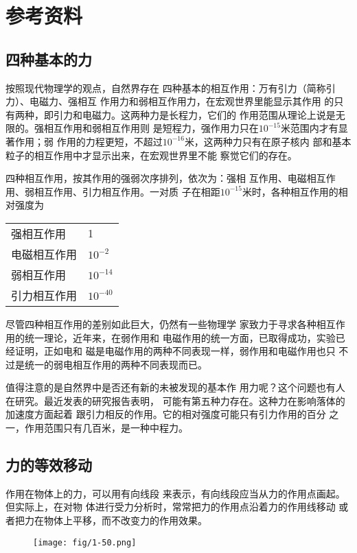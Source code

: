 \section{参考资料}
\subsection{四种基本的力}
按照现代物理学的观点，自然界存在
四种基本的相互作用：万有引力（简称引力）、电磁力、强相互
作用力和弱相互作用力，在宏观世界里能显示其作用
的只有两种，即引力和电磁力。这两种力是长程力，它们的
作用范围从理论上说是无限的。强相互作用和弱相互作用则
是短程力，强作用力只在$10^{-15}$米范围内才有显著作用；弱
作用的力程更短，不超过$10^{-16}$米，这两种力只有在原子核内
部和基本粒子的相互作用中才显示出来，在宏观世界里不能
察觉它们的存在。

四种相互作用，按其作用的强弱次序排列，依次为：强相
互作用、电磁相互作用、弱相互作用、引力相互作用。一对质
子在相距$10^{-15}$米时，各种相互作用的相对强度为
\begin{center}
    \begin{tabular}{p{}l}
  强相互作用&1\\
电磁相互作用&$10^{-2}$\\
弱相互作用&$10^{-14}$\\
引力相互作用&$10^{-40}$ 
    \end{tabular}
\end{center}

尽管四种相互作用的差别如此巨大，仍然有一些物理学
家致力于寻求各种相互作用的统一理论，近年来，在弱作用和
电磁作用的统一方面，已取得成功，实验已经证明，正如电和
磁是电磁作用的两种不同表现一样，弱作用和电磁作用也只
不过是统一的弱电相互作用的两种不同表现而已。

值得注意的是自然界中是否还有新的未被发现的基本作
用力呢？这个问题也有人在研究。最近发表的研究报告表明，
可能有第五种力存在。这种力在影响落体的加速度方面起着
跟引力相反的作用。它的相对强度可能只有引力作用的百分
之一，作用范围只有几百米，是一种中程力。

\subsection{力的等效移动}

作用在物体上的力，可以用有向线段
来表示，有向线段应当从力的作用点画起。但实际上，在对物
体进行受力分析时，常常把力的作用点沿着力的作用线移动
或者把力在物体上平移，而不改变力的作用效果。

\begin{figure}[htp]
    \centering
\texttt{[image: fig/1-50.png]}
    \caption{}
\end{figure}

